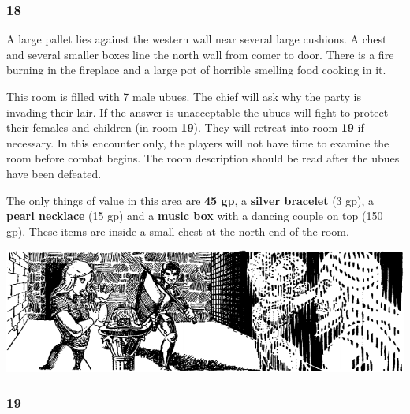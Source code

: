 \documentclass[palace_of_the_silver_princess]{subfiles}
\begin{document}
\subsubsection{18}
\begin{quotebox}
    A large pallet lies against the western wall near several large
    cushions. A chest and several smaller boxes line the north wall from
    comer to door. There is a fire burning in the fireplace and a large
    pot of horrible smelling food cooking in it.
\end{quotebox}

This room is filled with 7 male ubues.  The chief will ask why the party
is invading their lair. If the answer is unacceptable the ubues will
fight to protect their females and children (in room \textbf{19}). They
will retreat into room \textbf{19} if necessary. In this encounter only,
the players will not have time to examine the room before combat begins.
The room description should be read after the ubues have been defeated.

The only things of value in this area are \textbf{45 gp}, a
\textbf{silver bracelet} (3 gp), a \textbf{pearl necklace} (15 gp) and a
\textbf{music box} with a dancing couple on top (150 gp). These items
are inside a small chest at the north end of the room.

\clearpage
\includegraphics[width=\textwidth]{img/ruby_box.png}
\\

\subsubsection{19}
\end{document}

